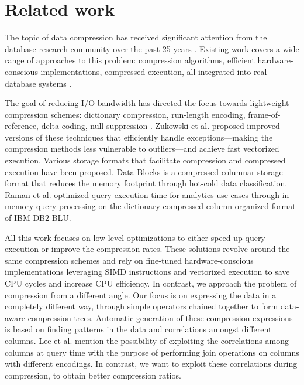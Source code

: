 
\chapter{Related work}
\label{ch:relatedwork}



\ifpdf
    \graphicspath{{7/figures/PNG/}{7/figures/PDF/}{7/figures/}}
\else
    \graphicspath{{7/figures/EPS/}{7/figures/}}
\fi


% 

The topic of data compression has received significant attention from the database research community over the past 25 years \cite{abadi2006integrating,zukowski2006super,lang2016data,polychroniou2015efficient,graefe1991data}. Existing work covers a wide range of approaches to this problem: compression algorithms, efficient hardware-conscious implementations, compressed execution, all integrated into real database systems \cite{kemper2011hyper,zukowski2012vectorwise}.

The goal of reducing I/O bandwidth has directed the focus towards lightweight compression schemes: dictionary compression, run-length encoding, frame-of-reference, delta coding, null suppression \cite{abadi2006integrating,goldstein1998compressing,lemire2015decoding,roth1993database,zukowski2006super}. Zukowski et al. \cite{zukowski2006super} proposed improved versions of these techniques that efficiently handle exceptions---making the compression methods less vulnerable to outliers---and achieve fast vectorized execution. Various storage formats that facilitate compression and compressed execution have been proposed. Data Blocks \cite{lang2016data} is a compressed columnar storage format that reduces the memory footprint through hot-cold data classification. Raman et al. \cite{raman2013db2} optimized query execution time for analytics use cases through in memory query processing on the dictionary compressed column-organized format of IBM DB2 BLU.

All this work focuses on low level optimizations to either speed up query execution or improve the compression rates. These solutions revolve around the same compression schemes and rely on fine-tuned hardware-conscious implementations leveraging SIMD instructions and vectorized execution to save CPU cycles and increase CPU efficiency. In contrast, we approach the problem of compression from a different angle. Our focus is on expressing the data in a completely different way, through simple operators chained together to form data-aware compression trees. Automatic generation of these compression expressions is based on finding patterns in the data and correlations amongst different columns. Lee et al. \cite{lee2014joins} mention the possibility of exploiting the correlations among columns at query time with the purpose of performing join operations on columns with different encodings. In contrast, we want to exploit these correlations during compression, to obtain better compression ratios.

